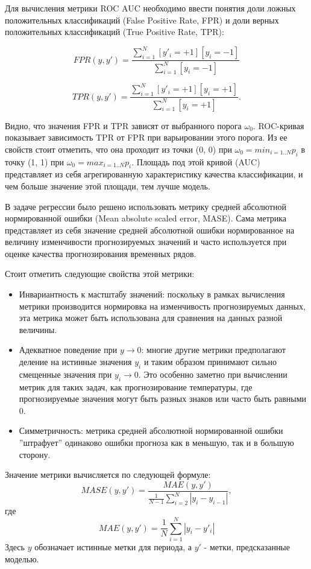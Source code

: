 Для вычисления метрики ROC AUC необходимо ввести понятия доли ложных положительных классификаций (False Positive Rate, FPR) и доли верных положительных классификаций (True Positive Rate, TPR):

$$
FPR(y,y') = \frac{\sum_{i=1}^N [y'_i = +1][y_i = -1]}{\sum_{i=1}^N [y_i = -1]}
$$

$$
TPR(y,y') = \frac{\sum_{i=1}^N [y'_i = +1][y_i = +1]}{\sum_{i=1}^N [y_i = +1]}.
$$

Видно, что значения FPR и TPR зависят от выбранного порога $\omega_0$. ROC-кривая показывает зависимость TPR от FPR при варьировании этого порога. Из ее свойств стоит отметить, что она проходит из точки (0, 0) при $\omega_0 = min_{i=1..N} p_i$ в точку (1, 1) при $\omega_0 = max_{i=1..N} p_i$. Площадь под этой кривой (AUC) представляет из себя агрегированную характеристику качества классификации, и чем больше значение этой площади, тем лучше модель.

В задаче регрессии было решено использовать метрику средней абсолютной нормированной ошибки (Mean absolute scaled error, MASE). Сама метрика представляет из себя значение средней абсолютной ошибки нормированное на величину изменчивости прогнозируемых значений и часто используется при оценке качества прогнозирования временных рядов.

Стоит отметить следующие свойства этой метрики:
\begin{itemize}
    \item Инвариантность к мастштабу значений: поскольку в рамках вычисления метрики производится нормировка на изменчивость прогнозируемых данных, эта метрика может быть использована для сравнения на данных разной величины.
    \item Адекватное поведение при $y \rightarrow 0$: многие другие метрики предполагают деление на истинные значения $y_i$ и таким образом принимают сильно смещенные значения при $y_i \rightarrow 0$. Это особенно заметно при вычислении метрик для таких задач, как прогнозирование температуры, где прогнозируемые значения могут быть разных знаков или часто быть равными 0.
     \item Симметричность: метрика средней абсолютной нормированной ошибки ''штрафует'' одинаково ошибки прогноза как в меньшую, так и в большую сторону.
\end{itemize}

Значение метрики вычисляется по следующей формуле:
$$
MASE(y, y') = \frac{MAE(y, y')}{\frac{1}{N-1}\sum_{i=2}^{N} |y_i - y_{i-1}|},
$$ где 
$$MAE(y, y') = \frac{1}{N}\sum_{i=1}^{N} |y_i - y'_i|$$
Здесь $y$ обозначает истинные метки для периода, а $y'$ - метки, предсказанные моделью.

